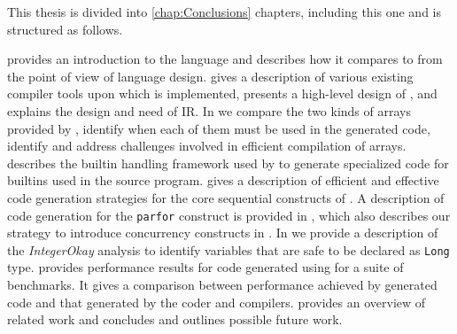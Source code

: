 This thesis is divided into \ref{chap:Conclusions} chapters, including this one
and is structured as follows.

 provides an introduction to the \xten language and describes
how it compares to \matlab from the point of view of language design.
 gives a description of various existing \matlab compiler
tools upon which \mixten is implemented, presents a high-level design of
\mixten, and explains the design and need of \mixten IR.  In
  we compare the two kinds of arrays provided by \xten,
identify when each of them must be used in the generated code, identify and
address challenges involved in efficient compilation of \matlab arrays.
 describes the builtin handling framework used by
\mixten to generate specialized code for \matlab builtins used in the source
program.   gives a description of efficient and
effective code generation strategies for the core sequential constructs of
\matlab. A description of code generation for the \matlab \texttt{parfor}
construct is provided in , which also describes our
strategy to introduce concurrency constructs in \matlab.  In
 we provide a description of the \emph{IntegerOkay}
analysis to identify variables that are safe to be declared as \texttt{Long}
type. 
provides performance results for code generated using \mixten for a suite of
benchmarks. It gives a comparison between performance achieved by \mixten
generated code and that generated by the \matlab coder and \mctwofor compilers.
 provides an overview of related work and
 concludes and outlines possible future work.
